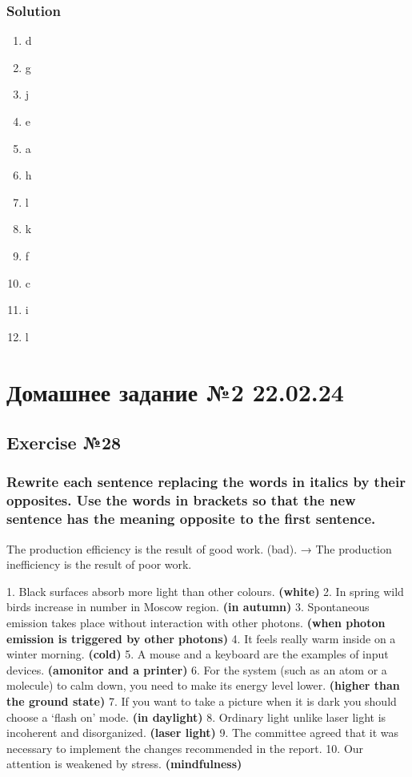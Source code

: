 \subsection*{Solution}
\begin{enumerate}
      \item d
      \item g
      \item j
      \item e
      \item a
      \item h
      \item l
      \item k
      \item f
      \item c
      \item i
      \item l
\end{enumerate}

\chapter{Домашнее задание №2 22.02.24}

\section{Exercise №28}
\subsection*{Rewrite each sentence replacing the words in italics by their opposites.
      Use the words in brackets so that the new sentence has the meaning opposite to
      the first sentence.}
The production efficiency is the result of good work. (bad). → The
production inefficiency is the result of poor work.

1. Black surfaces absorb more light than other colours. \textbf{(white)} 2. In spring wild birds
increase in number in Moscow region. \textbf{(in autumn)} 3. Spontaneous emission takes place
without interaction with other photons. \textbf{(when photon emission is triggered by other
      photons)} 4. It feels really warm inside on a winter morning. \textbf{(cold)} 5. A mouse and a
keyboard are the examples of input devices. \textbf{(amonitor and a printer)} 6. For the system
(such as an atom or a molecule) to calm down, you need to make its energy level lower.
\textbf{(higher than the ground state)} 7. If you want to take a picture when it is dark you
should choose a ‘flash on’ mode. \textbf{(in daylight)} 8. Ordinary light unlike laser light is
incoherent and disorganized. \textbf{(laser light)} 9. The committee agreed that it was necessary
to implement the changes recommended in the report. 10. Our attention is weakened by
stress. \textbf{(mindfulness)}

